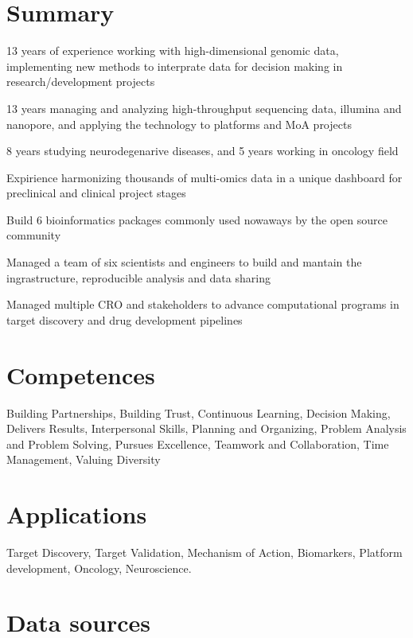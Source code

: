 \hypertarget{summary}{%
\section{Summary}\label{summary}}

13 years of experience working with high-dimensional genomic data, implementing new methods to interprate data for decision making in research/development projects

13 years managing and analyzing high-throughput sequencing data, illumina and nanopore, and applying the technology to platforms and MoA projects

8 years studying neurodegenarive diseases, and 5 years working in oncology field

Expirience harmonizing thousands of multi-omics data in a unique dashboard for preclinical and clinical project stages

Build 6 bioinformatics packages commonly used nowaways by the open source community

Managed a team of six scientists and engineers to build and mantain the ingrastructure, reproducible analysis and data sharing

Managed multiple CRO and stakeholders to advance computational programs in target discovery and drug development pipelines

\hypertarget{competences}{%
\section{Competences}\label{competences}}

Building Partnerships, Building Trust, Continuous Learning, Decision
Making, Delivers Results, Interpersonal Skills, Planning and Organizing,
Problem Analysis and Problem Solving, Pursues Excellence, Teamwork and
Collaboration, Time Management, Valuing Diversity

\hypertarget{application}{%
\section{Applications}\label{applications}}

Target Discovery, Target Validation, Mechanism of Action, Biomarkers, Platform development, Oncology, Neuroscience.

\hypertarget{Data sources}{%
\section{Data sources}\label{data}}

